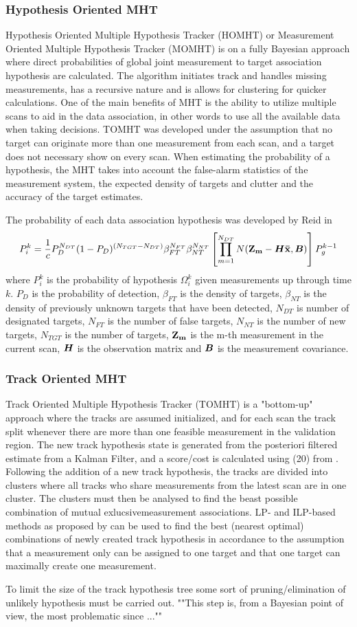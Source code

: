 \subsubsection{Hypothesis Oriented MHT}
Hypothesis Oriented Multiple Hypothesis Tracker (HOMHT) or Measurement Oriented Multiple Hypothesis Tracker (MOMHT) is on a fully Bayesian approach where direct probabilities of global joint measurement to target association hypothesis are calculated. The algorithm initiates track and handles missing measurements, has a recursive nature and is allows for clustering for quicker calculations. One of the main benefits of MHT is the ability to utilize multiple scans to aid in the data association, in other words to use all the available data when taking decisions. TOMHT was developed under the assumption that no target can originate more than one measurement from each scan, and a target does not necessary show on every scan. When estimating the probability of a hypothesis, the MHT takes into account the false-alarm statistics of the measurement system, the expected density of targets and clutter and the accuracy of the target estimates.

The probability of each data association hypothesis was developed by Reid in \cite{Reid1978}
\begin{equation}
P_i^k = \frac{1}{c} P_D^{N_{DT}}(1-P_D)^{(N_{TGT}-N_{DT})} \beta_{FT}^{N_{FT}} \beta_{NT}^{N_{NT}} \left[ \prod_{m=1}^{N_{DT}} N(\boldsymbol{\mathbf{Z_m}}-\bm{H}\boldsymbol{\mathbf{\bar{x}}},\bm{B}) \right] P_g^{k-1}
\end{equation}
where $P_i^k$ is the probability of hypothesis $\Omega_i^k$ given measurements up through time $k$. $P_D$ is the probability of detection, $\beta_{FT}$ is the density of targets, $\beta_{NT}$ is the density of previously unknown targets that have been detected, $N_{DT}$ is number of designated targets, $N_{FT}$ is the number of false targets, $N_{NT}$ is the number of new targets, $N_{TGT}$ is the number of targets, $\boldsymbol{\mathbf{Z_m}}$ is the m-th measurement in the current scan, $\bm{H}$ is the observation matrix and $\bm{B}$ is the measurement covariance.

\subsubsection{Track Oriented MHT}
Track Oriented Multiple Hypothesis Tracker (TOMHT) is a "bottom-up" approach where the tracks are assumed initialized, and for each scan the track split whenever there are more than one feasible measurement in the validation region. The new track hypothesis state is generated from the posteriori filtered estimate from a Kalman Filter, and a score/cost is calculated using (20) from \cite{Bar-Shalom2007}. Following the addition of a new track hypothesis, the tracks are divided into clusters where all tracks who share measurements from the latest scan are in one cluster. The clusters must then be analysed to find the beast possible combination of mutual exlucsivemeasurement associations. LP- and ILP-based methods as proposed by \cite{Storms2003} can be used to find the best (nearest optimal) combinations of newly created track hypothesis in accordance to the assumption that a measurement only can be assigned to one target and that one target can maximally create one measurement.

To limit the size of the track hypothesis tree some sort of pruning/elimination of unlikely hypothesis must be carried out. ""This step is, from a Bayesian point of view, the most problematic since ...""



